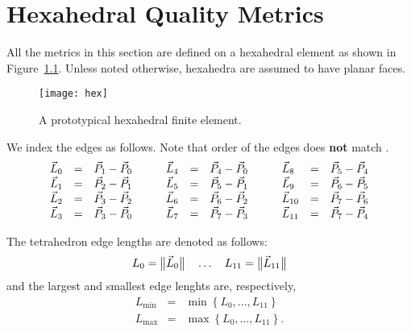 \chapter{Hexahedral Quality Metrics\label{s:hex}}

All the metrics in this section are defined on a hexahedral element
as shown in Figure~\ref{f:hex}.
Unless noted otherwise, hexahedra are assumed to have planar faces.

\begin{figure}[bhp]
  \centering
  \texttt{[image: hex]}
  \caption{A prototypical hexahedral finite element.%
                                                                  \label{f:hex}}
\end{figure}

We index the edges as follows.
Note that order of the edges does \textbf{not} match \vtk.
\begin{equation*}
\begin{array}{lclcl}
  \vec L_0    &=& \vec P_1 - \vec P_0\\
  \vec L_1    &=& \vec P_2 - \vec P_1\\
  \vec L_2    &=& \vec P_3 - \vec P_2\\
  \vec L_3    &=& \vec P_3 - \vec P_0
\end{array}\rule{2em}{0pt}
\begin{array}{lclcl}
  \vec L_4    &=& \vec P_4 - \vec P_0\\
  \vec L_5    &=& \vec P_5 - \vec P_1\\
  \vec L_6    &=& \vec P_6 - \vec P_2\\
  \vec L_7    &=& \vec P_7 - \vec P_3
\end{array}\rule{2em}{0pt}
\begin{array}{lclcl}
  \vec L_8    &=& \vec P_5 - \vec P_4\\
  \vec L_9    &=& \vec P_6 - \vec P_5\\
  \vec L_{10} &=& \vec P_7 - \vec P_6\\
  \vec L_{11} &=& \vec P_7 - \vec P_4
\end{array}
\end{equation*}

The tetrahedron edge lengths are denoted as follows:
\[
L_0 = \big\lVert{\vec L_0}\big\rVert\quad
\dots\quad
L_{11} = \big\lVert{\vec L_{11}}\big\rVert
\]
and the largest and smallest edge lenghts are, respectively,
\begin{equation*}
\begin{array}{lcl}
  L_{\min} &=& \min\left\{L_0, \dots, L_{11} \right\}\\
  L_{\max} &=& \max\left\{L_0, \dots, L_{11} \right\}.
\end{array}
\end{equation*}

